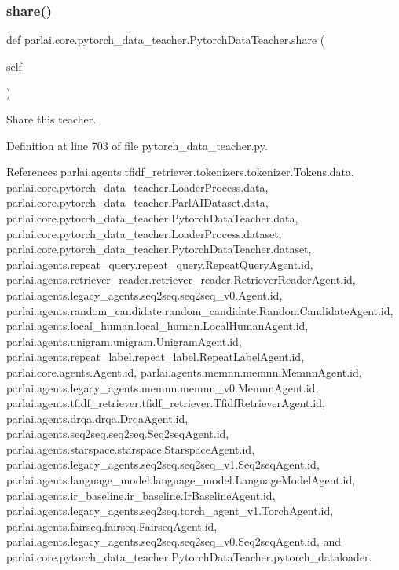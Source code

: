 \subsubsection{\texorpdfstring{share()}{share()}}
{\footnotesize\ttfamily def parlai.\+core.\+pytorch\+\_\+data\+\_\+teacher.\+Pytorch\+Data\+Teacher.\+share (\begin{DoxyParamCaption}\item[{}]{self }\end{DoxyParamCaption})}

\begin{DoxyVerb}Share this teacher.\end{DoxyVerb}
 

Definition at line 703 of file pytorch\+\_\+data\+\_\+teacher.\+py.



References parlai.\+agents.\+tfidf\+\_\+retriever.\+tokenizers.\+tokenizer.\+Tokens.\+data, parlai.\+core.\+pytorch\+\_\+data\+\_\+teacher.\+Loader\+Process.\+data, parlai.\+core.\+pytorch\+\_\+data\+\_\+teacher.\+Parl\+A\+I\+Dataset.\+data, parlai.\+core.\+pytorch\+\_\+data\+\_\+teacher.\+Pytorch\+Data\+Teacher.\+data, parlai.\+core.\+pytorch\+\_\+data\+\_\+teacher.\+Loader\+Process.\+dataset, parlai.\+core.\+pytorch\+\_\+data\+\_\+teacher.\+Pytorch\+Data\+Teacher.\+dataset, parlai.\+agents.\+repeat\+\_\+query.\+repeat\+\_\+query.\+Repeat\+Query\+Agent.\+id, parlai.\+agents.\+retriever\+\_\+reader.\+retriever\+\_\+reader.\+Retriever\+Reader\+Agent.\+id, parlai.\+agents.\+legacy\+\_\+agents.\+seq2seq.\+seq2seq\+\_\+v0.\+Agent.\+id, parlai.\+agents.\+random\+\_\+candidate.\+random\+\_\+candidate.\+Random\+Candidate\+Agent.\+id, parlai.\+agents.\+local\+\_\+human.\+local\+\_\+human.\+Local\+Human\+Agent.\+id, parlai.\+agents.\+unigram.\+unigram.\+Unigram\+Agent.\+id, parlai.\+agents.\+repeat\+\_\+label.\+repeat\+\_\+label.\+Repeat\+Label\+Agent.\+id, parlai.\+core.\+agents.\+Agent.\+id, parlai.\+agents.\+memnn.\+memnn.\+Memnn\+Agent.\+id, parlai.\+agents.\+legacy\+\_\+agents.\+memnn.\+memnn\+\_\+v0.\+Memnn\+Agent.\+id, parlai.\+agents.\+tfidf\+\_\+retriever.\+tfidf\+\_\+retriever.\+Tfidf\+Retriever\+Agent.\+id, parlai.\+agents.\+drqa.\+drqa.\+Drqa\+Agent.\+id, parlai.\+agents.\+seq2seq.\+seq2seq.\+Seq2seq\+Agent.\+id, parlai.\+agents.\+starspace.\+starspace.\+Starspace\+Agent.\+id, parlai.\+agents.\+legacy\+\_\+agents.\+seq2seq.\+seq2seq\+\_\+v1.\+Seq2seq\+Agent.\+id, parlai.\+agents.\+language\+\_\+model.\+language\+\_\+model.\+Language\+Model\+Agent.\+id, parlai.\+agents.\+ir\+\_\+baseline.\+ir\+\_\+baseline.\+Ir\+Baseline\+Agent.\+id, parlai.\+agents.\+legacy\+\_\+agents.\+seq2seq.\+torch\+\_\+agent\+\_\+v1.\+Torch\+Agent.\+id, parlai.\+agents.\+fairseq.\+fairseq.\+Fairseq\+Agent.\+id, parlai.\+agents.\+legacy\+\_\+agents.\+seq2seq.\+seq2seq\+\_\+v0.\+Seq2seq\+Agent.\+id, and parlai.\+core.\+pytorch\+\_\+data\+\_\+teacher.\+Pytorch\+Data\+Teacher.\+pytorch\+\_\+dataloader.

